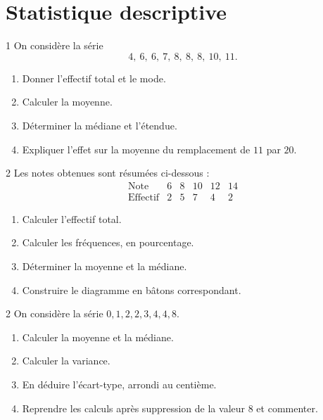 \section{Statistique descriptive}

\begin{exo}{1}
On considère la série
\[
  4,\ 6,\ 6,\ 7,\ 8,\ 8,\ 8,\ 10,\ 11.
\]
\begin{enumerate}
  \item Donner l'effectif total et le mode.
  \item Calculer la moyenne.
  \item Déterminer la médiane et l'étendue.
  \item Expliquer l'effet sur la moyenne du remplacement de $11$ par $20$.
\end{enumerate}
\end{exo}

\begin{exo}{2}
Les notes obtenues sont résumées ci-dessous :
\[
\begin{array}{c|ccccc}
\text{Note} & 6 & 8 & 10 & 12 & 14\\ \hline
\text{Effectif} & 2 & 5 & 7 & 4 & 2
\end{array}
\]
\begin{enumerate}
  \item Calculer l'effectif total.
  \item Calculer les fréquences, en pourcentage.
  \item Déterminer la moyenne et la médiane.
  \item Construire le diagramme en bâtons correspondant.
\end{enumerate}
\end{exo}

\begin{exo}{2}
On considère la série $0,1,2,2,3,4,4,8$.
\begin{enumerate}
  \item Calculer la moyenne et la médiane.
  \item Calculer la variance.
  \item En déduire l'écart-type, arrondi au centième.
  \item Reprendre les calculs après suppression de la valeur $8$ et commenter.
\end{enumerate}
\end{exo}

